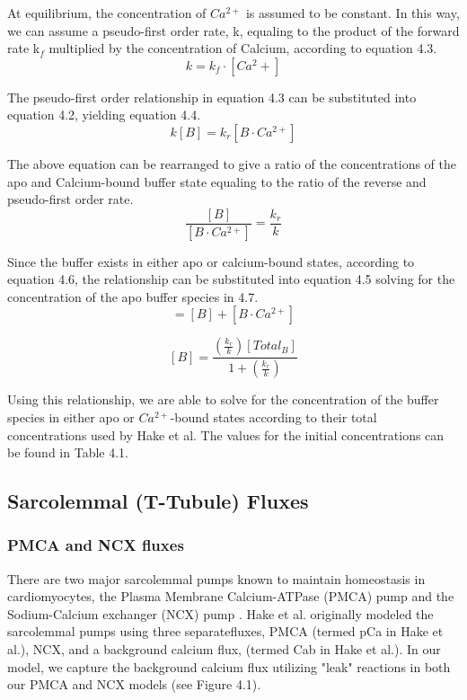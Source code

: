 \documentclass[12pt]{ucsddissertation}
\begin{document}
At equilibrium, the concentration of $Ca^{2+}$ is assumed to be constant. In this way, we can assume a pseudo-first order rate, k, equaling to the product of the forward rate k$_{f}$ multiplied by the concentration of Calcium, according to equation 4.3. 
\begin{equation}
 k = k_{f} \cdot [Ca^2+]
\end{equation}

The pseudo-first order relationship in equation 4.3 can be substituted into equation 4.2, yielding equation 4.4.
\begin{equation}
k[B] = k_{r}[B \cdot Ca^{2+}]
\end{equation}

The above equation can be rearranged to give a ratio of the concentrations of the apo and Calcium-bound buffer state equaling to the ratio of the reverse and pseudo-first order rate.
\begin{equation}
\frac{[B]}{[B  \cdot Ca^{2+}]} = \frac{k_{r}}{k} 
\end{equation}

Since the buffer exists in either apo or calcium-bound states, according to equation 4.6, the relationship can be substituted into equation 4.5 solving for the concentration of the apo buffer species in 4.7. 
\begin{equation}
[Total_{B}] = [B] + [B \cdot Ca^{2+}] 
\end{equation}

\begin{equation}
\left[ B\right] = \frac {\left( \frac {k_{r}}{k}\right) \left [Total_{B}\right] }{ 1+\left( \frac {k_{r}}{k}\right) }
\end{equation}

Using this relationship, we are able to solve for the concentration of the buffer species in either apo or $Ca^{2+}$-bound states according to their total concentrations used by Hake et al. The values for the initial concentrations can be found in Table 4.1.
\subsection{Sarcolemmal (T-Tubule) Fluxes}

\subsubsection{PMCA and NCX fluxes}

There are two major sarcolemmal pumps known to maintain homeostasis in cardiomyocytes, the Plasma Membrane Calcium-ATPase (PMCA) pump and the Sodium-Calcium exchanger (NCX) pump \cite{Bers2002}. Hake et al. originally modeled the sarcolemmal pumps using three separatefluxes, PMCA (termed pCa in Hake et al.), NCX, and a background calcium flux, (termed Cab in Hake et al.). In our model, we capture the background calcium flux utilizing "leak" reactions in both our PMCA and NCX models (see Figure 4.1). 
\end{document}
